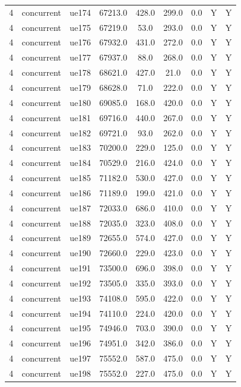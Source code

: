 \begin{table}[ht]
\begin{tabular}{|c|c|c|c|c|c|c|c|c|}
4 & concurrent & ue174 & 67213.0 & 428.0 & 299.0 & 0.0 & Y & Y \\
4 & concurrent & ue175 & 67219.0 & 53.0 & 293.0 & 0.0 & Y & Y \\
4 & concurrent & ue176 & 67932.0 & 431.0 & 272.0 & 0.0 & Y & Y \\
4 & concurrent & ue177 & 67937.0 & 88.0 & 268.0 & 0.0 & Y & Y \\
4 & concurrent & ue178 & 68621.0 & 427.0 & 21.0 & 0.0 & Y & Y \\
4 & concurrent & ue179 & 68628.0 & 71.0 & 222.0 & 0.0 & Y & Y \\
4 & concurrent & ue180 & 69085.0 & 168.0 & 420.0 & 0.0 & Y & Y \\
4 & concurrent & ue181 & 69716.0 & 440.0 & 267.0 & 0.0 & Y & Y \\
4 & concurrent & ue182 & 69721.0 & 93.0 & 262.0 & 0.0 & Y & Y \\
4 & concurrent & ue183 & 70200.0 & 229.0 & 125.0 & 0.0 & Y & Y \\
4 & concurrent & ue184 & 70529.0 & 216.0 & 424.0 & 0.0 & Y & Y \\
4 & concurrent & ue185 & 71182.0 & 530.0 & 427.0 & 0.0 & Y & Y \\
4 & concurrent & ue186 & 71189.0 & 199.0 & 421.0 & 0.0 & Y & Y \\
4 & concurrent & ue187 & 72033.0 & 686.0 & 410.0 & 0.0 & Y & Y \\
4 & concurrent & ue188 & 72035.0 & 323.0 & 408.0 & 0.0 & Y & Y \\
4 & concurrent & ue189 & 72655.0 & 574.0 & 427.0 & 0.0 & Y & Y \\
4 & concurrent & ue190 & 72660.0 & 229.0 & 423.0 & 0.0 & Y & Y \\
4 & concurrent & ue191 & 73500.0 & 696.0 & 398.0 & 0.0 & Y & Y \\
4 & concurrent & ue192 & 73505.0 & 335.0 & 393.0 & 0.0 & Y & Y \\
4 & concurrent & ue193 & 74108.0 & 595.0 & 422.0 & 0.0 & Y & Y \\
4 & concurrent & ue194 & 74110.0 & 224.0 & 420.0 & 0.0 & Y & Y \\
4 & concurrent & ue195 & 74946.0 & 703.0 & 390.0 & 0.0 & Y & Y \\
4 & concurrent & ue196 & 74951.0 & 342.0 & 386.0 & 0.0 & Y & Y \\
4 & concurrent & ue197 & 75552.0 & 587.0 & 475.0 & 0.0 & Y & Y \\
4 & concurrent & ue198 & 75552.0 & 227.0 & 475.0 & 0.0 & Y & Y \\

\end{tabular}
\end{table}
